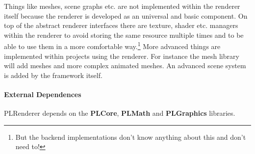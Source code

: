 Things like meshes, scene graphs etc. are not implemented within the renderer itself because the renderer is developed as an universal and basic component. On top of the abstract renderer interfaces there are texture, shader etc. managers within the renderer to avoid storing the same resource multiple times and to be able to use them in a more comfortable way.\footnote{But the backend implementations don't know anything about this and don't need to!} More advanced things are implemented within projects using the renderer. For instance the mesh library will add meshes and more complex animated meshes. An advanced scene system is added by the framework itself.


\paragraph{External Dependences}
PLRenderer depends on the \textbf{PLCore}, \textbf{PLMath} and \textbf{PLGraphics} libraries.





\cleardoublepage

\cleardoublepage

\cleardoublepage
\cleardoublepage
\cleardoublepage
\cleardoublepage
\cleardoublepage
\cleardoublepage
